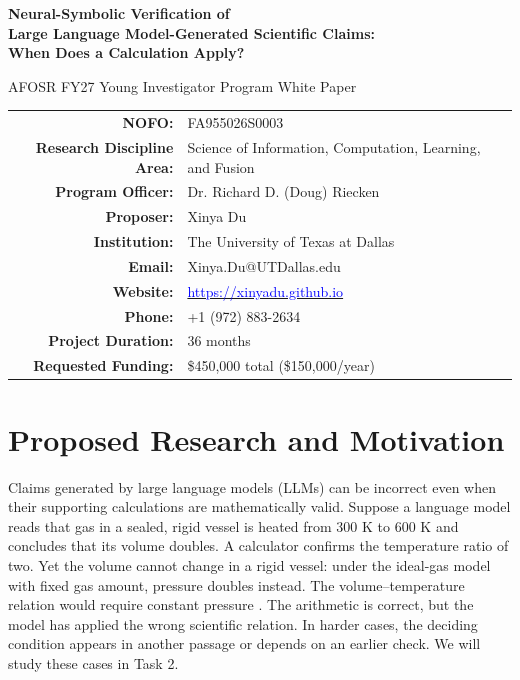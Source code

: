 \documentclass[12pt]{article}
\begin{document}
\begin{titlepage}
\thispagestyle{empty}
\begin{center}
\vspace*{1.0in}

{\Large\bfseries Neural-Symbolic Verification of\\
Large Language Model-Generated Scientific Claims:\\
When Does a Calculation Apply?\par}

\vspace{0.6in}

{\large AFOSR FY27 Young Investigator Program White Paper\par}

\vspace{0.35in}

\begin{tabular}{rl}
\textbf{NOFO:} & FA955026S0003 \\
\textbf{Research Discipline Area:} & Science of Information, Computation, Learning, and Fusion \\
\textbf{Program Officer:} & Dr. Richard D. (Doug) Riecken \\
\textbf{Proposer:} & Xinya Du \\
\textbf{Institution:} & The University of Texas at Dallas \\
\textbf{Email:} & Xinya.Du@UTDallas.edu \\
\textbf{Website:} & \href{https://xinyadu.github.io}{\textcolor{blue}{https://xinyadu.github.io}} \\
\textbf{Phone:} & +1 (972) 883-2634 \\
\textbf{Project Duration:} & 36 months \\
\textbf{Requested Funding:} & \$450,000 total (\$150,000/year) \\
\end{tabular}

\vspace{0.2in}
\end{center}
\vfill
\end{titlepage}

\setcounter{page}{1}
\hypersetup{pageanchor=true}

\section*{Proposed Research and Motivation}

Claims generated by large language models (LLMs) can be incorrect even when their supporting calculations are mathematically valid. Suppose a language model reads that gas in a sealed, rigid vessel is heated from 300 K to 600 K and concludes that its volume doubles. A calculator confirms the temperature ratio of two. Yet the volume cannot change in a rigid vessel: under the ideal-gas model with fixed gas amount, pressure doubles instead. The volume--temperature relation would require constant pressure \citep{nasaState}. The arithmetic is correct, but the model has applied the wrong scientific relation. In harder cases, the deciding condition appears in another passage or depends on an earlier check. We will study these cases in Task 2.
\end{document}
